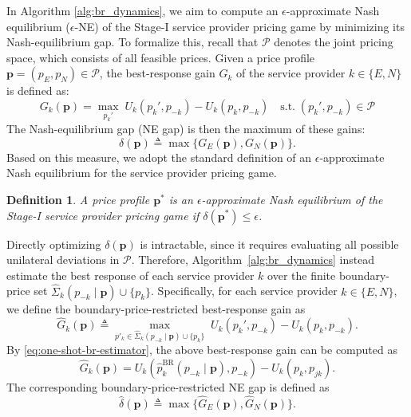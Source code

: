 \documentclass[lettersize,journal]{IEEEtran}
\newtheorem{definition}{Definition}
\begin{document}
In Algorithm \ref{alg:br_dynamics}, we aim to compute an $\epsilon$-approximate Nash equilibrium ($\epsilon$-NE) of the Stage-I service provider pricing game by minimizing its Nash-equilibrium gap. To formalize this, recall that $\mathcal{P}$ denotes the joint pricing space, which consists of all feasible prices. Given a price profile $\boldsymbol{p}=(p_E,p_N)\in\mathcal{P}$, the best-response gain $G_k$ of the service provider $k\in\{E,N\}$ is defined as:
\begin{equation}\label{eq:gap_def}
    G_k(\boldsymbol{p})=\max_{p_k'}\;U_k(p_k',p_{-k})-U_k(p_k,p_{-k})\quad\text{s.t.}\;(p_k',p_{-k})\in\mathcal{P}
\end{equation}
The Nash-equilibrium gap (NE gap) is then the maximum of these gains:
\begin{equation}\label{eq:NE-gap}
    \delta(\boldsymbol{p})\triangleq\max\{G_E(\boldsymbol{p}),G_N(\boldsymbol{p})\}.
\end{equation}
Based on this measure, we adopt the standard definition of an $\epsilon$-approximate Nash equilibrium for the service provider pricing game.
\begin{definition}\label{eps-ne}
    A price profile $\boldsymbol{p}^*$ is an $\epsilon$-approximate Nash equilibrium of the Stage-I service provider pricing game if $\delta(\boldsymbol{p}^*)\le\epsilon$.
\end{definition}

Directly optimizing $\delta(\boldsymbol{p})$ is intractable, since it requires evaluating all possible unilateral deviations in $\mathcal{P}$. Therefore, Algorithm~\ref{alg:br_dynamics} instead estimate the best response of each service provider $k$ over the finite boundary-price set $\widehat{\Sigma}_k(p_{-k}\mid\boldsymbol{p})\cup\{p_k\}$. Specifically, for each service provider $k\in\{E,N\}$, we define the boundary-price-restricted best-response gain as
\begin{equation}\label{eq:hat-G_k-def}
    \widehat{G}_k(\boldsymbol{p})\triangleq\max_{p'_k\in\hat{\Sigma}_k(p_{-k}\mid \boldsymbol{p})\cup\{p_k\}}\;U_k(p_k',p_{-k})-U_k(p_k,p_{-k}).
\end{equation}
By \eqref{eq:one-shot-br-estimator}, the above best-response gain can be computed as
\begin{equation}\label{eq:hat-G_k-comp}
    \widehat{G}_k(\boldsymbol{p})=U_k(\widehat{p}_k^{\mathrm{BR}}(p_{-k}\mid\boldsymbol p),p_{-k})-U_k(p_k,p_{jk}).
\end{equation}
The corresponding boundary-price-restricted NE gap is defined as
\begin{equation}
    \widehat{\delta}(\boldsymbol{p})\triangleq\max\{\widehat{G}_E(\boldsymbol{p}),\widehat{G}_N(\boldsymbol{p})\}.
\end{equation}
\end{document}
